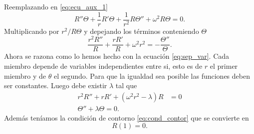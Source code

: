 Reemplazando en \eqref{eq:ecu_aux_1}
\begin{equation*}\label{eq:ecua_aux_2} 
R''\Theta +\frac{1}{r}R'\Theta+\frac{1}{r^2}R\Theta''+\omega^2R\Theta=0.
\end{equation*}
Multiplicando por $r^2/R\Theta$ y depejando los términos conteniendo $\Theta$
\begin{equation}\label{eq:ecua_aux_3} 
\frac{r^2R''}{R} +\frac{rR'}{R}+\omega^2r^2=-\frac{\Theta''}{\Theta}.
\end{equation}
Ahora se razona como lo hemos hecho con la ecuación \eqref{eq:sep_var}. Cada miembro depende de variables independientes entre si, esto es de $r$ el primer miembro y de $\theta$ el segundo. Para que la igualdad sea posible las funciones deben ser constantes. Luego debe existir $\lambda$ tal que
\begin{align}
r^2R'' +rR'+(\omega^2r^2-\lambda) R&=0\label{eq:ecua_aux_4}\\
\Theta'' +\lambda\Theta=0\label{eq:ecua_aux_5}.
\end{align}
Además teníamos la condición de contorno \eqref{eq:cond_contor} que se convierte en 
\begin{equation}\label{eq:cond_contor}
R(1)=0.
\end{equation}

